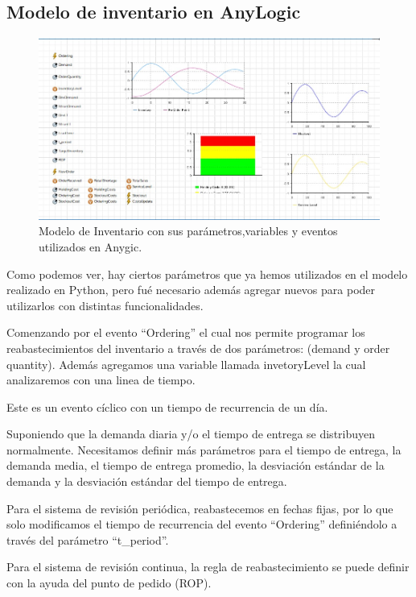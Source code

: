 \subsection{Modelo de inventario en AnyLogic}
\label{subsec:modelo-de-inventario-en-anylogic}
\begin{figure}[H]
    \includegraphics[width=\linewidth]{images/anylogic-inventario}
    \caption{Modelo de Inventario con sus parámetros,variables y eventos utilizados en Anygic.}
\end{figure}

Como podemos ver, hay ciertos parámetros que ya hemos utilizados en el modelo realizado en Python, pero fué necesario además agregar nuevos para poder utilizarlos con distintas funcionalidades.

Comenzando por el evento ``Ordering'' el cual nos permite programar los reabastecimientos del inventario a través de dos parámetros: (demand y order quantity). Además agregamos una variable llamada invetoryLevel la cual analizaremos con una linea de tiempo.

Este es un evento cíclico con un tiempo de recurrencia de un día.

Suponiendo que la demanda diaria y/o el tiempo de entrega se distribuyen normalmente.
Necesitamos definir más  parámetros para el tiempo de entrega, la demanda media, el tiempo de entrega promedio, la desviación estándar de la demanda y la desviación estándar del tiempo de entrega.

Para el sistema de revisión periódica, reabastecemos en fechas fijas, por lo que solo modificamos el tiempo de recurrencia del evento ``Ordering'' definiéndolo a través del parámetro ``t\_period''.

Para el sistema de revisión continua, la regla de reabastecimiento se puede definir con la ayuda del punto de pedido (ROP).

